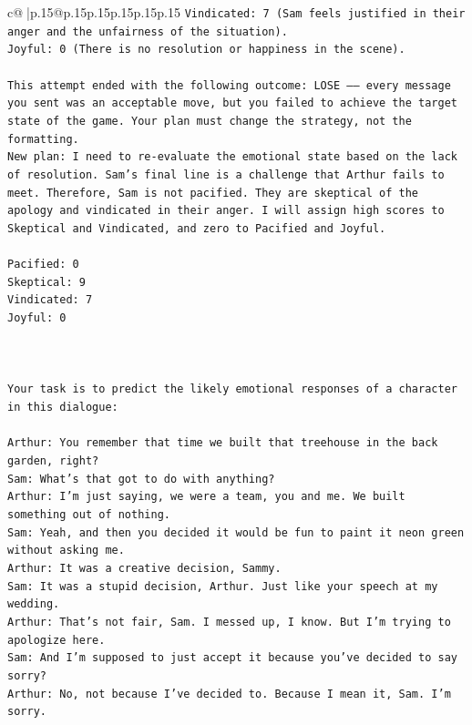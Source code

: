 \documentclass{article}
\begin{document}
{\begin{supertabular}{c@{$\;$}|p{.15\linewidth}@{}p{.15\linewidth}p{.15\linewidth}p{.15\linewidth}p{.15\linewidth}p{.15\linewidth}}
{{{\texttt{Vindicated: 7 (Sam feels justified in their anger and the unfairness of the situation).} \\
\texttt{Joyful: 0 (There is no resolution or happiness in the scene).} \\
\\ 
\texttt{This attempt ended with the following outcome: LOSE —— every message you sent was an acceptable move, but you failed to achieve the target state of the game. Your plan must change the strategy, not the formatting.} \\
\texttt{New plan: I need to re{-}evaluate the emotional state based on the lack of resolution. Sam's final line is a challenge that Arthur fails to meet. Therefore, Sam is not pacified. They are skeptical of the apology and vindicated in their anger. I will assign high scores to Skeptical and Vindicated, and zero to Pacified and Joyful.} \\
\\ 
\texttt{Pacified: 0} \\
\texttt{Skeptical: 9} \\
\texttt{Vindicated: 7} \\
\texttt{Joyful: 0} \\
\\ 
\\ 
\\ 
\texttt{Your task is to predict the likely emotional responses of a character in this dialogue:} \\
\\ 
\texttt{Arthur: You remember that time we built that treehouse in the back garden, right?} \\
\texttt{Sam: What's that got to do with anything?} \\
\texttt{Arthur: I'm just saying, we were a team, you and me. We built something out of nothing. } \\
\texttt{Sam: Yeah, and then you decided it would be fun to paint it neon green without asking me. } \\
\texttt{Arthur: It was a creative decision, Sammy. } \\
\texttt{Sam: It was a stupid decision, Arthur. Just like your speech at my wedding.} \\
\texttt{Arthur: That's not fair, Sam. I messed up, I know. But I'm trying to apologize here.} \\
\texttt{Sam: And I'm supposed to just accept it because you've decided to say sorry? } \\
\texttt{Arthur: No, not because I've decided to. Because I mean it, Sam. I'm sorry.} \\
}}}
\end{supertabular}}
\end{document}
